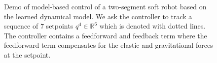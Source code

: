 \begin{figure}[ht]
    \centering
    \caption{Demo of model-based control of a two-segment soft robot based on the learned dynamical model. We ask the controller to track a sequence of $7$ setpoints $q^\mathrm{d}\in \mathbb{R}^6$ which is denoted with dotted lines. The controller contains a feedforward and feedback term where the feedforward term compensates for the elastic and gravitational forces at the setpoint. 
    }
    \label{fig:pcsregression:results:control:pcs_ns-2}
\end{figure}

